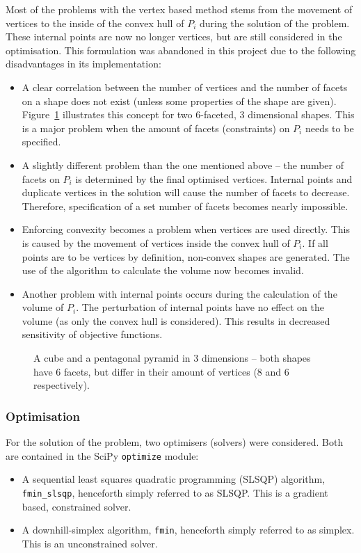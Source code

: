 Most of the problems with the vertex based method stems from the movement of vertices to the inside of the convex hull of $P_i$ during the solution of the problem.
These internal points are now no longer vertices, but are still considered in the optimisation.
This formulation was abandoned in this project due to the following disadvantages in its implementation:
\begin{itemize}
  \item A clear correlation between the number of vertices and the number of facets on a shape does not exist (unless some properties of the shape are given).
Figure~\ref{fig:vertsvsfaces} illustrates this concept for two 6-faceted, 3 dimensional shapes.
This is a major problem when the amount of facets (constraints) on $P_i$ needs to be specified.
  \item A slightly different problem than the one mentioned above -- the number of facets on $P_i$ is determined by the final optimised vertices.
Internal points and duplicate vertices in the solution will cause the number of facets to decrease.
Therefore, specification of a set number of facets becomes nearly impossible.
  \item Enforcing convexity becomes a problem when vertices are used directly.
This is caused by the movement of vertices inside the convex hull of $P_i$.
If all points are to be vertices by definition, non-convex shapes are generated.
The use of the \qhull algorithm to calculate the volume now becomes invalid. 
  \item Another problem with internal points occurs during the calculation of the volume of $P_i$.
The perturbation of internal points have no effect on the volume (as only the convex hull is considered).
This results in decreased sensitivity of objective functions.
\end{itemize}

\begin{figure}[htbp]
  \centering
  \scalebox{1.5}{}  
  \caption[The unclear correlation between number of facets and vertices]{A cube and a pentagonal pyramid in 3 dimensions -- both shapes have 6 facets, but differ in their amount of vertices (8 and 6  respectively).}
  \label{fig:vertsvsfaces}
\end{figure}

\subsubsection{Optimisation}
For the solution of the problem, two optimisers (solvers) were considered.
Both are contained in the SciPy \texttt{optimize} module:
\begin{itemize}
  \item A sequential least squares quadratic programming (SLSQP) algorithm, \texttt{fmin\_slsqp}, henceforth simply referred to as SLSQP. 
This is a gradient based, constrained solver.
  \item A downhill-simplex algorithm, \texttt{fmin}, henceforth simply referred to as simplex.
This is an unconstrained solver.
\end{itemize}

